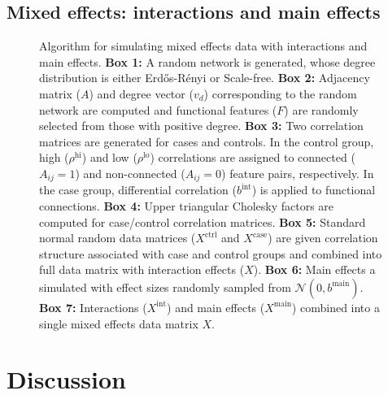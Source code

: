 \documentclass[10pt,letterpaper]{article}\usepackage[]{graphicx}\usepackage[]{color}
\begin{document}
\subsection{Mixed effects: interactions and main effects}

\begin{figure}[H]
 \centering
	
 \caption{Algorithm for simulating mixed effects data with interactions and main effects. \textbf{Box 1:} A random network is generated, whose degree distribution is either Erd\H{o}s-R\'{e}nyi or Scale-free. \textbf{Box 2:} Adjacency matrix ($A$) and degree vector ($v_d$) corresponding to the random network are computed and functional features ($F$) are randomly selected from those with positive degree. \textbf{Box 3:} Two correlation matrices are generated for cases and controls. In the control group, high ($\rho^\text{hi}$) and low ($\rho^\text{lo}$) correlations are assigned to connected ($A_{ij}=1$) and non-connected ($A_{ij}=0$) feature pairs, respectively. In the case group, differential correlation ($b^\text{int}$) is applied to functional connections. \textbf{Box 4:} Upper triangular Cholesky factors are computed for case/control correlation matrices. \textbf{Box 5:} Standard normal random data matrices ($X^\text{ctrl}$ and $X^\text{case}$) are given correlation structure associated with case and control groups and combined into full data matrix with interaction effects ($X$). \textbf{Box 6:} Main effects a simulated with effect sizes randomly sampled from $\mathcal{N}(0,b^\text{main})$. \textbf{Box 7:} Interactions ($X^\text{int}$) and main effects ($X^\text{main}$) combined into a single mixed effects data matrix $X$.}\label{fig:mixed_sim}
\end{figure}

\section{Discussion}


\end{document}
